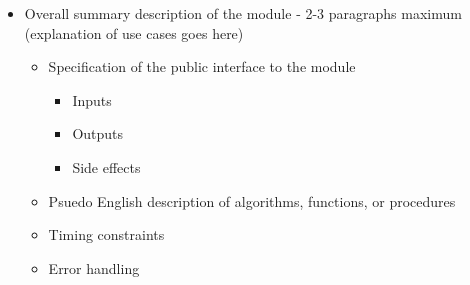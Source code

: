 \documentclass[12pt]{article} %
\begin{document}
\begin{itemize}
	\item Overall summary description of the module - 2-3 paragraphs maximum
		(explanation of use cases goes here)

		\begin{itemize}
			\item Specification of the public interface to the module

				\begin{itemize}
					\item Inputs
					\item Outputs
					\item Side effects
				\end{itemize}

			\item Psuedo English description of algorithms, functions, or procedures
			\item Timing constraints
			\item Error handling
		\end{itemize}
\end{itemize}
\end{document}

